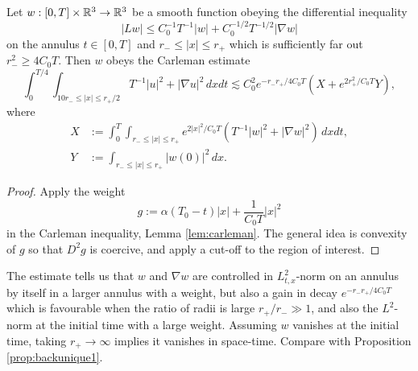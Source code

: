 \begin{proposition}
	Let $w : [0, T] \times \mathbb R^3 \to \mathbb R^3$ be a smooth function obeying the differential inequality 
		\[
			|Lw| \leq C_0^{-1} T^{-1} |w| + C_0^{-1/2} T^{-1/2} |\nabla w|
		\]
	on the annulus $t \in [0, T]$ and $r_- \leq |x| \leq r_+$ which is sufficiently far out $r_-^2 \geq 4C_0 T$. Then $w$ obeys the Carleman estimate
		\[
			\int_0^{T/4} \int_{10 r_- \leq |x| \leq r_+/2}T^{-1} |u|^2 + |\nabla u|^2 \, dx dt
				\lesssim C_0^2 e^{-r_-r_+/4C_0 T} (X + e^{2r^2_+/C_0T} Y),
		\]	
	where
		\begin{align*}
			X
				&:= \int_0^T \int_{r_- \leq |x| \leq r_+} e^{2|x|^2/C_0 T} (T^{-1} |w|^2 + |\nabla w|^2) \, dx dt, \\
			Y
				&:= \int_{r_- \leq |x| \leq r_+} |w(0)|^2 \, dx.
		\end{align*}	
\end{proposition}	

\begin{proof}
	Apply the weight
		\[
			g:= \alpha (T_0 - t) |x| + \frac{1}{C_0 T} |x|^2
		\]
	in the Carleman inequality, Lemma \ref{lem:carleman}. The general idea is convexity of $g$ so that $D^2 g$ is coercive, and apply a cut-off to the region of interest.
\end{proof}

\begin{remark}
	The estimate tells us that $w$ and $\nabla w$ are controlled in $L^2_{t, x}$-norm on an annulus by itself in a larger annulus with a weight, but also a gain in decay $e^{-r_- r_+/4C_0 T}$ which is favourable when the ratio of radii is large $r_+/r_- \gg 1$, and also the $L^2$-norm at the initial time with a large weight. Assuming $w$ vanishes at the initial time, taking $r_+ \to \infty$ implies it vanishes in space-time. Compare with Proposition \ref{prop:backunique1}.
\end{remark}

